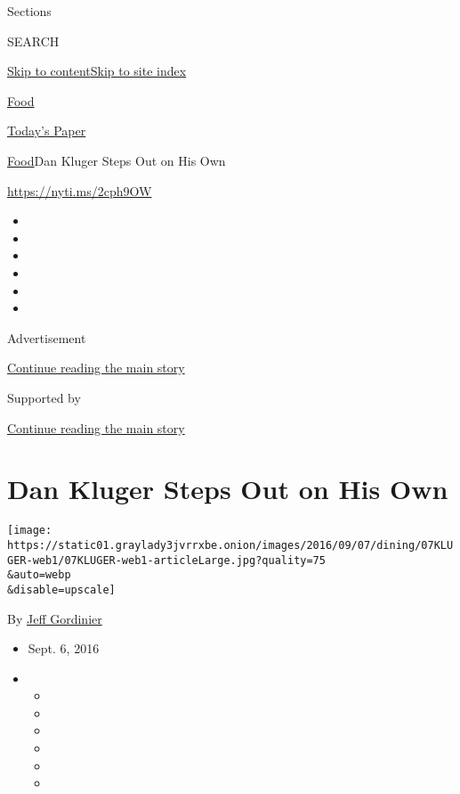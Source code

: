 Sections

SEARCH

\protect\hyperlink{site-content}{Skip to
content}\protect\hyperlink{site-index}{Skip to site index}

\href{https://www.nytimes3xbfgragh.onion/section/food}{Food}

\href{https://myaccount.nytimes3xbfgragh.onion/auth/login?response_type=cookie\&client_id=vi}{}

\href{https://www.nytimes3xbfgragh.onion/section/todayspaper}{Today's
Paper}

\href{/section/food}{Food}\textbar{}Dan Kluger Steps Out on His Own

\url{https://nyti.ms/2cph9OW}

\begin{itemize}
\item
\item
\item
\item
\item
\item
\end{itemize}

Advertisement

\protect\hyperlink{after-top}{Continue reading the main story}

Supported by

\protect\hyperlink{after-sponsor}{Continue reading the main story}

\hypertarget{dan-kluger-steps-out-on-his-own}{%
\section{Dan Kluger Steps Out on His
Own}\label{dan-kluger-steps-out-on-his-own}}

\texttt{[image: https://static01.graylady3jvrrxbe.onion/images/2016/09/07/dining/07KLUGER-web1/07KLUGER-web1-articleLarge.jpg?quality=75\\\&auto=webp\\\&disable=upscale]}

By \href{http://www.nytimes3xbfgragh.onion/by/jeff-gordinier}{Jeff
Gordinier}

\begin{itemize}
\item
  Sept. 6, 2016
\item
  \begin{itemize}
  \item
  \item
  \item
  \item
  \item
  \item
  \end{itemize}
\end{itemize}

